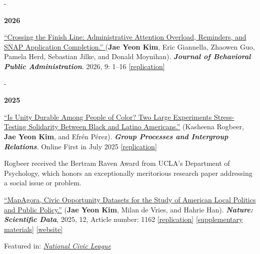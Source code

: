 \documentclass[10pt, letterpaper]{article}
\makeatletter
\newcommand{\needspace}[1]{%
  \par\penalty-100\begingroup
  \setlength{\dimen@}{#1}%
  \dimen@ii\pagegoal \advance\dimen@ii-\pagetotal
  \ifdim\dimen@>\dimen@ii \break\fi
  \endgroup
}
\newcommand{\pubyear}[1]{\needspace{6\baselineskip}\item[]\vspace{0.3\baselineskip}\textbf{#1}}
\renewenvironment{itemize}{
\begin{list}{}{
        \setlength{\leftmargin}{1.5em}
        \setlength{\itemsep}{0.10em}
        \setlength{\parskip}{0pt}
        \setlength{\parsep}{0.10em}
    }
}{
\end{list}
}
\makeatother
\begin{document}
\begin{etaremune}
\pubyear{2026}
\item \href{https://journal-bpa.org/index.php/jbpa/article/view/424}{``Crossing the Finish Line: Administrative Attention Overload, Reminders, and SNAP Application Completion.'' } (\textbf{Jae Yeon Kim}, Eric Giannella, Zhaowen Guo, Pamela Herd, Sebastian Jilke, and Donald Moynihan). \textbf{\textit{Journal of Behavioral Public Administration}}. 2026, 9: 1–16 \href{https://osf.io/rxgqm/overview}{[replication]}\\ 

\pubyear{2025}
\item \href{https://journals.sagepub.com/doi/10.1177/13684302251346402}{``Is Unity Durable Among People of Color? Two Large Experiments Stress-Testing Solidarity Between Black and Latino Americans.''} (Kasheena Rogbeer, \textbf{Jae Yeon Kim}, and Efrén Pérez). \textbf{\textit{Group Processes and Intergroup Relations}}. Online First in July 2025 \href{https://osf.io/8v47g/wiki/home/?view_only=48bfb8aa43a2491caf9f6c310f37c009}{[replication]}
\begin{itemize}
    \item Rogbeer received the Bertram Raven Award from UCLA's Department of Psychology, which honors an exceptionally meritorious research paper addressing a social issue or problem.
\end{itemize}

\item \href{https://www.nature.com/articles/s41597-025-05353-6.epdf?sharing_token=4HNrMMO7VOt9eQU42u5HrtRgN0jAjWel9jnR3ZoTv0Mpc6G86FwIcTyoYmFsd3Uahts-NrsxWU-Q0gVeUk6vtZN_k8pGamsuixpoqi1fOhudhtavd6jX7U8p5I4FQf1oJKpcfff8nLXFvlsgow1agfORM7KYSpMi13jgivdJVAs%3D}{``MapAgora, Civic Opportunity Datasets for the Study of American Local Politics and Public Policy.''} (\textbf{Jae Yeon Kim}, Milan de Vries, and Hahrie Han). \textbf{\textit{Nature: Scientific Data}}, 2025, 12, Article number: 1162 \href{https://github.com/snfagora/american_civic_opportunity_datasets}{[replication]} \href{https://www.readcube.com/articles/supplement?doi=10.1038%2Fs41597-025-05353-6&index=0}{[supplementary materials]} \href{https://snfagora.github.io/modern_agora_dashboard/#about}{[website]}
\begin{itemize}
    \item Featured in: \textit{\href{https://www.nationalcivicleague.org/mapping-civic-opportunity-in-america-what-the-data-reveal-about-democracys-hidden-infrastructure/}{National Civic League}}
\end{itemize}


\end{etaremune}
\end{document}
